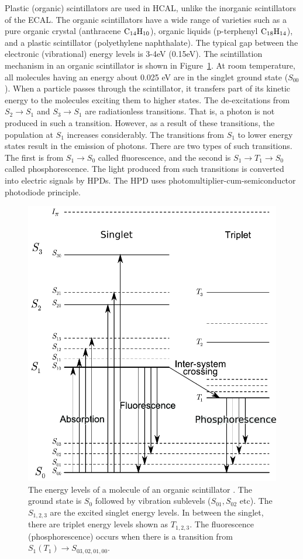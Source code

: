 Plastic (organic) scintillators are used in HCAL, unlike the inorganic scintillators 
of the ECAL. The organic scintillators have a wide range of varieties such as a
pure organic crystal (anthracene $\rm C_{14}\rm H_{10}$), organic liquids 
(p-terphenyl $\rm C_{18}\rm H_{14}$), and a plastic scintillator (polyethylene 
naphthalate). The typical gap between the electronic (vibrational) energy 
levels is 3-4\unit{eV} (0.15\unit{eV}). The scintillation mechanism in an organic scintillator
is shown in Figure~\ref{fig:cms_org_sinti}. At room temperature, all 
molecules having an energy about 0.025 eV are in the singlet ground state
($S_{00}$). When a particle passes through the scintillator, it transfers part of its 
kinetic energy to the molecules exciting them to higher states. The 
de-excitations from $S_2 \rightarrow S_1$ and $S_3 \rightarrow S_1$ are radiationless transitions.
That is, a photon is not produced in such a transition. However, as a result of 
these transitions, the population at $S_1$ increases considerably. The 
transitions from $S_1$ to lower energy states result in the emission of 
photons. There are two types of such transitions. The first is from 
$S_1 \rightarrow S_0$ called fluorescence, and the second is 
$S_1 \rightarrow T_1 \rightarrow S_0$ called phosphorescence. The light 
produced from such transitions is converted into electric signals by HPDs. 
The HPD uses photomultiplier-cum-semiconductor photodiode principle.  
\begin{figure}
  \begin{center}
  \includegraphics[width=0.5\linewidth]{Experiment/CMS/Image/HCAL/organic_sinti.pdf}
	\caption{The energy levels of a molecule of an organic scintillator 
	  \cite{wiki:orgSinti}. The ground state is $S_0$ followed by vibration
	  sublevels ($S_{01}, S_{02}$ etc). The $S_{1, 2, 3}$ are the excited 
	  singlet energy levels. In between the singlet, there are triplet energy 
	  levels shown as $T_{1, 2, 3}$. The fluorescence (phosphorescence) occurs
	  when there is a transition from $S_1 (T_1) \rightarrow S_{03, 02, 01, 00}$.}
  \label{fig:cms_org_sinti}
  \end{center}
\end{figure}


